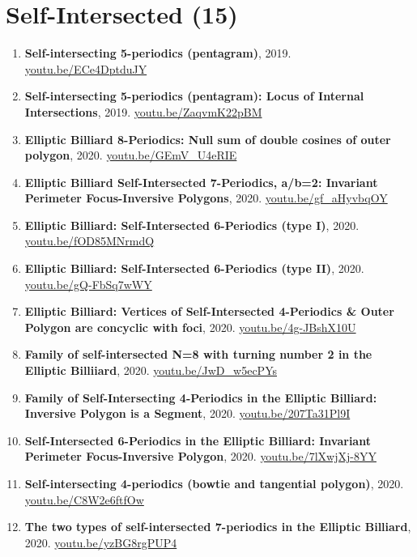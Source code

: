 \documentclass[12pt]{article}
\begin{document}
\section{Self-Intersected (15)}

\begin{enumerate}[resume]
\item \textbf{Self-intersecting 5-periodics (pentagram)}, 2019. \href{https://youtu.be/ECe4DptduJY}{\url{youtu.be/ECe4DptduJY}}
\item \textbf{Self-intersecting 5-periodics (pentagram): Locus of Internal Intersections}, 2019. \href{https://youtu.be/ZaqvmK22pBM}{\url{youtu.be/ZaqvmK22pBM}}
\item \textbf{Elliptic Billiard 8-Periodics: Null sum of double cosines of outer polygon}, 2020. \href{https://youtu.be/GEmV_U4eRIE}{\url{youtu.be/GEmV\_U4eRIE}}
\item \textbf{Elliptic Billiard Self-Intersected 7-Periodics, a/b=2: Invariant Perimeter Focus-Inversive Polygons}, 2020. \href{https://youtu.be/gf_aHyvbqOY}{\url{youtu.be/gf\_aHyvbqOY}}
\item \textbf{Elliptic Billiard: Self-Intersected 6-Periodics (type I)}, 2020. \href{https://youtu.be/fOD85MNrmdQ}{\url{youtu.be/fOD85MNrmdQ}}
\item \textbf{Elliptic Billiard: Self-Intersected 6-Periodics (type II)}, 2020. \href{https://youtu.be/gQ-FbSq7wWY}{\url{youtu.be/gQ-FbSq7wWY}}
\item \textbf{Elliptic Billiard: Vertices of Self-Intersected 4-Periodics \& Outer Polygon are concyclic with foci}, 2020. \href{https://youtu.be/4g-JBshX10U}{\url{youtu.be/4g-JBshX10U}}
\item \textbf{Family of self-intersected N=8 with turning number 2 in the Elliptic Billiiard}, 2020. \href{https://youtu.be/JwD_w5ecPYs}{\url{youtu.be/JwD\_w5ecPYs}}
\item \textbf{Family of Self-Intersecting 4-Periodics in the Elliptic Billiard: Inversive Polygon is a Segment}, 2020. \href{https://youtu.be/207Ta31Pl9I}{\url{youtu.be/207Ta31Pl9I}}
\item \textbf{Self-Intersected 6-Periodics in the Elliptic Billiard: Invariant Perimeter Focus-Inversive Polygon}, 2020. \href{https://youtu.be/7lXwjXj-8YY}{\url{youtu.be/7lXwjXj-8YY}}
\item \textbf{Self-intersecting 4-periodics (bowtie and tangential polygon)}, 2020. \href{https://youtu.be/C8W2e6ftfOw}{\url{youtu.be/C8W2e6ftfOw}}
\item \textbf{The two types of self-intersected 7-periodics in the Elliptic Billiard}, 2020. \href{https://youtu.be/yzBG8rgPUP4}{\url{youtu.be/yzBG8rgPUP4}}

\end{enumerate}
\end{document}
